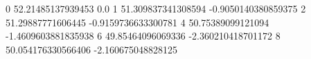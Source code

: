0 52.21485137939453 0.0
1 51.309837341308594 -0.9050140380859375
2 51.29887771606445 -0.9159736633300781
4 50.75389099121094 -1.4609603881835938
6 49.85464096069336 -2.360210418701172
8 50.054176330566406 -2.160675048828125
